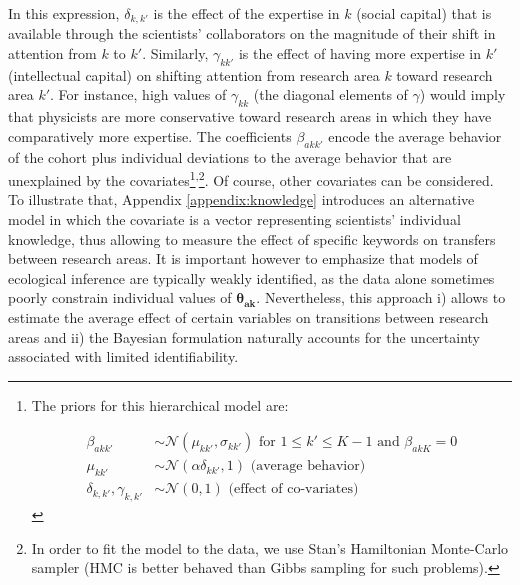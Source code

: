 \documentclass{article}
\begin{document}
In this expression, $\delta_{k,k'}$ is the effect of the expertise in $k$ (social capital) that is available through the scientists' collaborators on the magnitude of their shift in attention from $k$ to $k'$. Similarly, $\gamma_{kk'}$ is the effect of having more expertise in $k'$ (intellectual capital) on shifting attention from research area $k$ toward research area $k'$. For instance, high values of $\gamma_{kk}$ (the diagonal elements of $\gamma$) would imply that physicists are more conservative toward research areas in which they have comparatively more expertise. The coefficients $\beta_{akk'}$ encode the average behavior of the cohort plus individual deviations to the average behavior that are unexplained by the covariates\footnote{The priors for this hierarchical model are:

\begin{align}
    \beta_{akk'} &\sim \mathcal{N}(\mu_{k k'},\sigma_{k k'}) \text{ for } 1\leq k' \leq K-1 \text{ and } \beta_{ak K} = 0\\
    \mu_{k k'} &\sim \mathcal{N}(\alpha \delta_{kk'},1) \text{ (average behavior)}\\
    \delta_{k,k'},\gamma_{k,k'} &\sim \mathcal{N}(0,1)  \text { (effect of co-variates)}
\end{align}
}\textsuperscript{,}\footnote{In order to fit the model to the data, we use Stan's Hamiltonian Monte-Carlo sampler (HMC is better behaved than Gibbs sampling for such problems).%
}. Of course, other covariates can be considered. To illustrate that, Appendix \ref{appendix:knowledge} 
 introduces an alternative model in which the covariate is a vector representing scientists' individual knowledge, thus allowing to measure the effect of specific keywords on transfers between research areas. It is important however to emphasize that models of ecological inference are typically weakly identified, as the data alone sometimes poorly constrain individual values of $\bm{\theta_{ak}}$.  %
Nevertheless, this approach i) allows to estimate the average effect of certain variables on transitions between research areas and ii) the Bayesian formulation naturally accounts for the uncertainty associated with limited identifiability.
\end{document}
